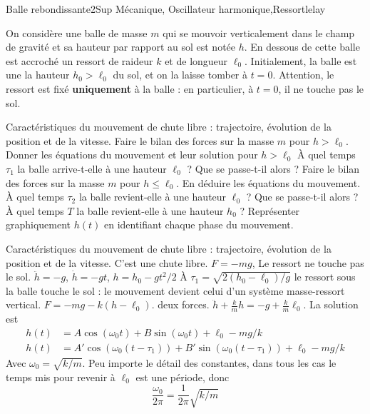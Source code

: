 
\begin{exercise}{Balle rebondissante}{2}{Sup}
{Mécanique, Oscillateur harmonique,Ressort}{lelay}

On considère une balle de masse $m$ qui se mouvoir verticalement dans le champ de gravité et sa hauteur par rapport au sol est notée $h$. En dessous de cette balle est accroché un ressort de raideur $k$ et de longueur $\ell_0$. Initialement, la balle est une la hauteur $h_0 > \ell_0$ du sol, et on la laisse tomber à $t = 0$. Attention, le ressort est fixé \textbf{uniquement} à la balle : en particulier, à $t=0$, il ne touche pas le sol.
\begin{questions}
    \questioncours Caractéristiques du mouvement de chute libre : trajectoire, évolution de la position et de la vitesse.
    \question Faire le bilan des forces sur la masse $m$ pour $h > \ell_0$.
    \question Donner les équations du mouvement et leur solution pour $h > \ell_0$
    \question  À quel temps $\tau_1$ la balle arrive-t-elle à une hauteur $\ell_0$ ? Que se passe-t-il alors ? 
    \question Faire le bilan des forces sur la masse $m$ pour $h \leq \ell_0$.
    \question En déduire les équations du mouvement. À quel temps $\tau_2$ la balle revient-elle à une hauteur $\ell_0$ ?
    \question Que se passe-t-il alors ? À quel temps $T$ la balle revient-elle à une hauteur $h_0$ ?
    \question Représenter graphiquement $h(t)$ en identifiant chaque phase du mouvement.
\end{questions}

\begin{solution}

\begin{questions}
    \questioncours Caractéristiques du mouvement de chute libre : trajectoire, évolution de la position et de la vitesse.
    \question C'est une chute libre. $F = -mg$, Le ressort ne touche pas le sol.
    \question $\ddot h = -g$, $\dot h  = -gt$, $h = h_0 - gt^2/2$
    \question À $\tau_1 = \sqrt{2(h_0 - \ell_0)/g}$ le ressort sous la balle touche le sol : le mouvement devient celui d'un système masse-ressort vertical.
    \question $F = -mg - k(h - \ell_0)$. deux forces.
    \question $\ddot h + \frac{k}m h= -g + \frac{k}m \ell_0$. La solution est 
    \begin{align*}
    h (t) &= A\cos(\omega_0t) + B \sin(\omega_0t) + \ell_0 - mg/k \\ 
    h (t) &= A'\cos(\omega_0(t - \tau_1)) + B' \sin(\omega_0(t - \tau_1)) + \ell_0 - mg/k
    \end{align*}
    Avec $\omega_0 = \sqrt{k/m}$. Peu importe le détail des constantes, dans tous les cas le temps mis pour revenir à $\ell_0$ est une période, donc $$\frac{\omega_0}{2\pi} = \frac{1}{2\pi}\sqrt{k/m} $$
    

\end{questions}
\end{solution}
\end{exercise}
